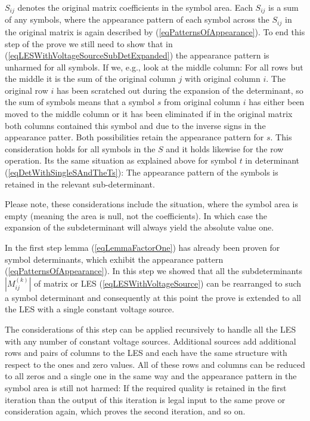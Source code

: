 $S_{ij}$ denotes the original matrix coefficients in the symbol area. Each
$S_{ij}$ is a sum of any symbols, where the appearance pattern of each
symbol across the $S_{ij}$ in the original matrix is again described by
(\ref{eqPatternsOfAppearance}). To end this step of the prove we still
need to show that in (\ref{eqLESWithVoltageSourceSubDetExpanded}) the
appearance pattern is unharmed for all symbols. If we, e.g., look at the
middle column: For all rows but the middle it is the sum of the original
column $j$ with original column $i$. The original row $i$ has been
scratched out during the expansion of the determinant, so the sum of
symbols means that a symbol $s$ from original column $i$ has either been
moved to the middle column or it has been eliminated if in the original
matrix both columns contained this symbol and due to the inverse signs in
the appearance patter. Both possibilities retain the appearance pattern
for $s$. This consideration holds for all symbols in the $S$ and it holds
likewise for the row operation. Its the same situation as explained above
for symbol $t$ in determinant (\ref{eqDetWithSingleSAndTheTs}): The
appearance pattern of the symbols is retained in the relevant
sub-determinant.

Please note, these considerations include the situation, where the symbol
area is empty (meaning the area is null, not the coefficients). In which
case the expansion of the subdeterminant will always yield the absolute
value one.

In the first step lemma (\ref{eqLemmaFactorOne}) has already been proven
for symbol determinants, which exhibit the appearance pattern
(\ref{eqPatternsOfAppearance}). In this step we showed that all the
subdeterminants $\left|M^{(k)}_{ij}\right|$ of matrix or LES
(\ref{eqLESWithVoltageSource}) can be rearranged to such a symbol
determinant and consequently at this point the prove is extended to all
the LES with a single constant voltage source.

The considerations of this step can be applied recursively to handle all
the LES with any number of constant voltage sources. Additional sources
add additional rows and pairs of columns to the LES and each have the same
structure with respect to the ones and zero values. All of these rows and
columns can be reduced to all zeros and a single one in the same way and
the appearance pattern in the symbol area is still not harmed: If the
required quality is retained in the first iteration than the output of
this iteration is legal input to the same prove or consideration again,
which proves the second iteration, and so on.


